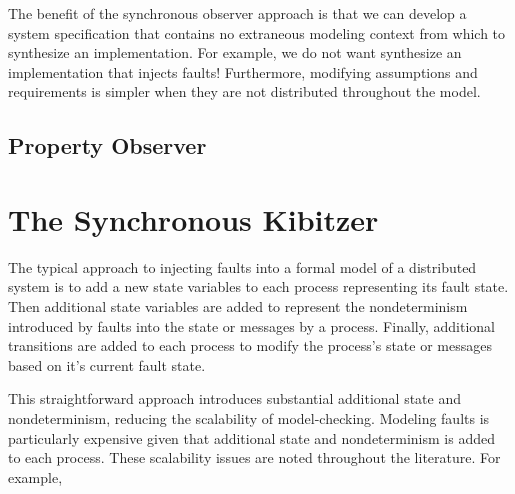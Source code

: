 \documentclass{IEEEtran/IEEEtran}
\newcommand{\lee}[1]{ } %
\newcommand{\lee}[1]{ {\color{blue}$<$lee: #1$>$} } %
\begin{document}
The benefit of the synchronous observer approach is that we can develop a system specification that contains no extraneous modeling context from which to synthesize an implementation. For example, we do not want synthesize an implementation that injects faults! Furthermore, modifying assumptions and requirements is simpler when they are not distributed throughout the model.






\subsection{Property Observer}


\section{The Synchronous Kibitzer}
The typical approach to injecting faults into a formal model of a distributed system is to add a new state variables to each process representing its fault state. Then additional state variables are added to represent the nondeterminism introduced by faults into the state or messages by a process. Finally, additional transitions are added to each process to modify the process's state or messages based on it's current fault state.

This straightforward approach introduces substantial additional state and nondeterminism, reducing the scalability of model-checking. Modeling faults is particularly expensive given that additional state and nondeterminism is added to each process. These scalability issues are noted throughout the literature. For example, \lee{TTA startup paper, helmut's paper, etc.}
\end{document}
